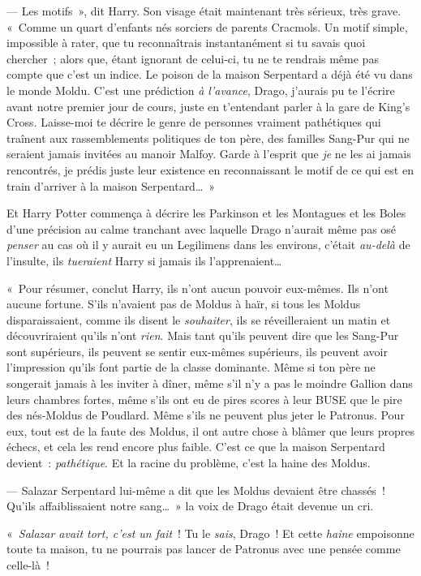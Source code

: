 --- Les motifs~», dit Harry. Son visage était maintenant très sérieux, très grave. «~Comme un quart d'enfants nés sorciers de parents Cracmols. Un motif simple, impossible à rater, que tu reconnaîtrais instantanément si tu savais quoi chercher~; alors que, étant ignorant de celui-ci, tu ne te rendrais même pas compte que c'est un indice. Le poison de la maison Serpentard a déjà été vu dans le monde Moldu. C'est une prédiction \emph{à l'avance}, Drago, j'aurais pu te l'écrire avant notre premier jour de cours, juste en t'entendant parler à la gare de King's Cross. Laisse-moi te décrire le genre de personnes vraiment pathétiques qui traînent aux rassemblements politiques de ton père, des familles Sang-Pur qui ne seraient jamais invitées au manoir Malfoy. Garde à l'esprit que \emph{je} ne les ai jamais rencontrés, je prédis juste leur existence en reconnaissant le motif de ce qui est en train d'arriver à la maison Serpentard…~»

Et Harry Potter commença à décrire les Parkinson et les Montagues et les Boles d'une précision au calme tranchant avec laquelle Drago n'aurait même pas osé \emph{penser} au cas où il y aurait eu un Legilimens dans les environs, c'était \emph{au-delà} de l'insulte, ils \emph{tueraient} Harry si jamais ils l'apprenaient…

«~Pour résumer, conclut Harry, ils n'ont aucun pouvoir eux-mêmes. Ils n'ont aucune fortune. S'ils n'avaient pas de Moldus à haïr, si tous les Moldus disparaissaient, comme ils disent le \emph{souhaiter}, ils se réveilleraient un matin et découvriraient qu'ils n'ont \emph{rien}. Mais tant qu'ils peuvent dire que les Sang-Pur sont supérieurs, ils peuvent se sentir eux-mêmes supérieurs, ils peuvent avoir l'impression qu'ils font partie de la classe dominante. Même si ton père ne songerait jamais à les inviter à dîner, même s'il n'y a pas le moindre Gallion dans leurs chambres fortes, même s'ils ont eu de pires scores à leur BUSE que le pire des nés-Moldus de Poudlard. Même s'ils ne peuvent plus jeter le Patronus. Pour eux, tout est de la faute des Moldus, il ont autre chose à blâmer que leurs propres échecs, et cela les rend encore plus faible. C'est ce que la maison Serpentard devient~: \emph{pathétique}. Et la racine du problème, c'est la haine des Moldus.

--- Salazar Serpentard lui-même a dit que les Moldus devaient être chassés~! Qu'ils affaiblissaient notre sang…~» la voix de Drago était devenue un cri.

«~\emph{Salazar avait tort, c'est un fait}~! Tu le \emph{sais}, Drago~! Et cette \emph{haine} empoisonne toute ta maison, tu ne pourrais pas lancer de Patronus avec une pensée comme celle-là~!

